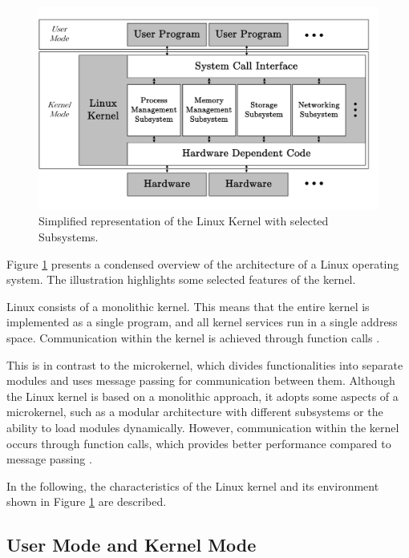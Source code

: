 \begin{figure}[h]
    \centering
    \includegraphics[width=1\linewidth]{figures/linux_kernel/image01.pdf}
    \caption[Simplified representation of the Linux Kernel with selected Subsystems]{Simplified representation of the Linux Kernel with selected Subsystems.}
    \label{fig:LinuxKernel}
\end{figure}

Figure \ref{fig:LinuxKernel} presents a condensed overview of the architecture of a Linux operating system. The illustration highlights some selected features of the kernel.

Linux consists of a monolithic kernel. This means that the entire kernel is implemented as a single program, and all kernel services run in a single address space. Communication within the kernel is achieved through function calls \cite{like02}.

This is in contrast to the microkernel, which divides functionalities into separate modules and uses message passing for communication between them. Although the Linux kernel is based on a monolithic approach, it adopts some aspects of a microkernel, such as a modular architecture with different subsystems or the ability to load modules dynamically. However, communication within the kernel occurs through function calls, which provides better performance compared to message passing \cite{like08}.

In the following, the characteristics of the Linux kernel and its environment shown in Figure \ref{fig:LinuxKernel} are described.


\subsection{User Mode and Kernel Mode}


